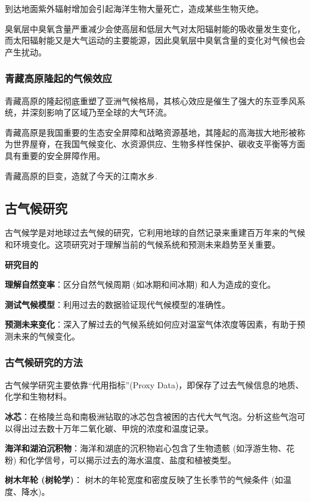 \documentclass[12pt,a4paper]{article}
\begin{document}
	到达地面紫外辐射增加会引起海洋生物大量死亡，造成某些生物灭绝。
	
	臭氧层中臭氧含量严重减少会使高层和低层大气对太阳辐射能的吸收量发生变化，而太阳辐射能又是大气运动的主要能源，因此臭氧层中臭氧含量的变化对气候也会产生扰动。
	
	\subsubsection{青藏高原隆起的气候效应}
	
	青藏高原的隆起彻底重塑了亚洲气候格局，其核心效应是催生了强大的东亚季风系统，并深刻影响了区域乃至全球的大气环流。
	
	青藏高原是我国重要的生态安全屏障和战略资源基地，其隆起的高海拔大地形被称为世界屋脊，在我国气候变化、水资源供应、生物多样性保护、碳收支平衡等方面具有重要的安全屏障作用。
	
	青藏高原的巨变，造就了今天的江南水乡.
	
	\subsection{古气候研究}
	
	古气候学是对地球过去气候的研究，它利用地球的自然记录来重建百万年来的气候和环境变化。这项研究对于理解当前的气候系统和预测未来趋势至关重要。
	
	\textbf{研究目的}
	
	\textbf{理解自然变率}：区分自然气候周期 (如冰期和间冰期) 和人为造成的变化。
	
	\textbf{测试气候模型}：利用过去的数据验证现代气候模型的准确性。
	
	\textbf{预测未来变化}：深入了解过去的气候系统如何应对温室气体浓度等因素，有助于预测未来的气候变化。
	
	\subsubsection{古气候研究的方法}
	
	古气候学研究主要依靠“代用指标”(Proxy Data)，即保存了过去气候信息的地质、化学和生物材料。
	
	\textbf{冰芯}：在格陵兰岛和南极洲钻取的冰芯包含被困的古代大气气泡。分析这些气泡可以得出过去数十万年二氧化碳、甲烷的浓度和温度记录。
	
	\textbf{海洋和湖泊沉积物}：海洋和湖底的沉积物岩心包含了生物遗骸 (如浮游生物、花粉) 和化学信号，可以揭示过去的海水温度、盐度和植被类型。
	
	\textbf{树木年轮 (树轮学)}： 树木的年轮宽度和密度反映了生长季节的气候条件 (如温度、降水)。
	
\end{document}
